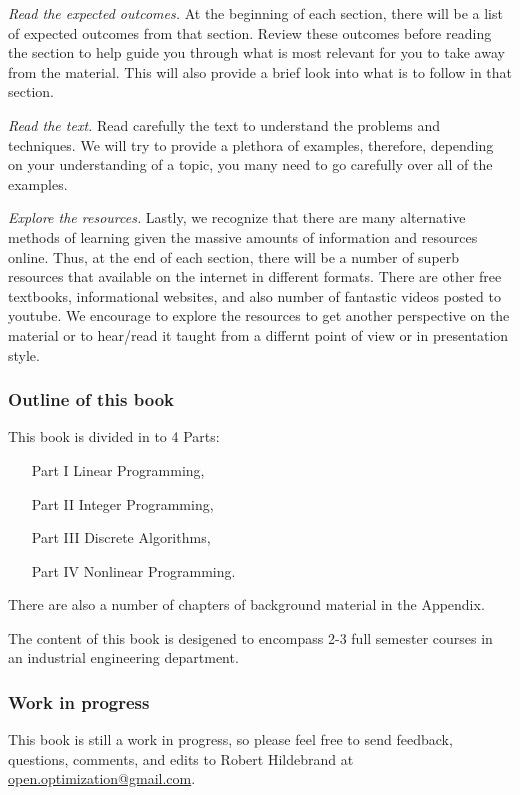 \documentclass[letter,12pt]{book}
\renewcommand{\0}{\mathbf{0}}
\begin{document}
\emph{Read the expected outcomes.} At the beginning of each section, there will be a list of expected outcomes from that section.  Review these outcomes before reading the section to help guide you through what is most relevant for you to take away from the material.  This will also provide a brief look into what is to follow in that section.

\emph{Read the text.} Read carefully the text to understand the problems and techniques.  We will try to provide a plethora of examples, therefore, depending on your understanding of a topic, you many need to go carefully over all of the examples.

\emph{Explore the resources.} Lastly, we recognize that there are many alternative methods of learning given the massive amounts of information and resources online.   Thus, at the end of each section, there will be a number of superb resources that available on the internet in different formats.   There are other free textbooks, informational websites, and also number of fantastic videos posted to youtube.  We encourage to explore the resources to get another perspective on the material or to hear/read it taught from a differnt point of view or in presentation style.  


\subsubsection*{Outline of this book}
This book is divided in to 4 Parts: 
\begin{enumerate}
\item[Part I] Linear Programming,
\item[Part II] Integer Programming,
\item[Part III] Discrete Algorithms,
\item[Part IV]  Nonlinear Programming.
\end{enumerate}
There are also a number of chapters of background material in the Appendix.

The content of this book is desigened to encompass 2-3 full semester courses in an industrial engineering department. 

\subsubsection*{Work in progress}
This book is still a work in progress, so please feel free to send feedback, questions, comments, and edits to Robert Hildebrand at \url{open.optimization@gmail.com}.
 
\end{document}
